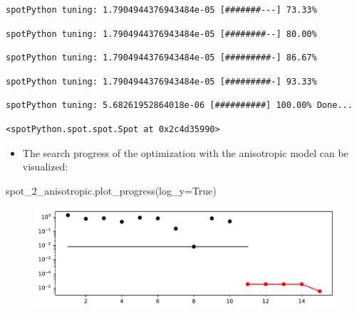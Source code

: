 \documentclass[
  letterpaper,
  DIV=11,
  numbers=noendperiod]{scrreprt}
\newenvironment{Shaded}{\begin{snugshade}}{\end{snugshade}}
\newcommand{\NormalTok}[1]{\textcolor[rgb]{0.00,0.23,0.31}{#1}}
\newcommand{\OperatorTok}[1]{\textcolor[rgb]{0.37,0.37,0.37}{#1}}
\newcommand{\VariableTok}[1]{\textcolor[rgb]{0.07,0.07,0.07}{#1}}
\providecommand{\tightlist}{%
  \setlength{\itemsep}{0pt}\setlength{\parskip}{0pt}}\usepackage{longtable,booktabs,array}
\begin{document}
\begin{verbatim}
spotPython tuning: 1.7904944376943484e-05 [#######---] 73.33% 
\end{verbatim}

\begin{verbatim}
spotPython tuning: 1.7904944376943484e-05 [########--] 80.00% 
\end{verbatim}

\begin{verbatim}
spotPython tuning: 1.7904944376943484e-05 [#########-] 86.67% 
\end{verbatim}

\begin{verbatim}
spotPython tuning: 1.7904944376943484e-05 [#########-] 93.33% 
\end{verbatim}

\begin{verbatim}
spotPython tuning: 5.68261952864018e-06 [##########] 100.00% Done...
\end{verbatim}

\begin{verbatim}
<spotPython.spot.spot.Spot at 0x2c4d35990>
\end{verbatim}

\begin{itemize}
\tightlist
\item
  The search progress of the optimization with the anisotropic model can
  be visualized:
\end{itemize}

\begin{Shaded}
\begin{Highlighting}[]
\NormalTok{spot\_2\_anisotropic.plot\_progress(log\_y}\OperatorTok{=}\VariableTok{True}\NormalTok{)}
\end{Highlighting}
\end{Shaded}

\begin{figure}[H]

{\centering \includegraphics{009_num_spot_anisotropic_files/figure-pdf/cell-9-output-1.pdf}

}

\end{figure}
\end{document}
